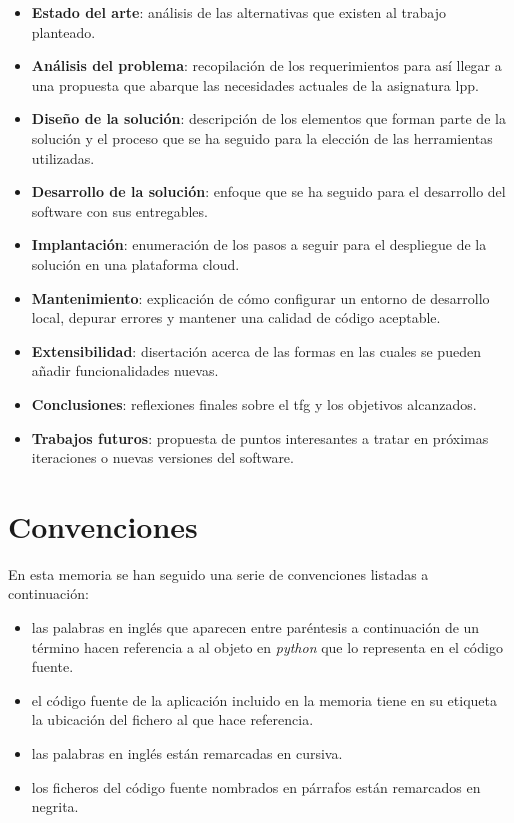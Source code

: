 \documentclass[11pt,spanish,listoffigures,listoftables]{tfgetsinf}
\begin{document}
\begin{itemize}
	\item \textbf{Estado del arte}: análisis de las alternativas que existen al trabajo planteado. 
	\item \textbf{Análisis del problema}: recopilación de los requerimientos para así llegar a una propuesta que abarque las necesidades actuales de la asignatura \acrshort{lpp}.
	\item \textbf{Diseño de la solución}: descripción de los elementos que forman parte de la solución y el proceso que se ha seguido para la elección de las herramientas utilizadas.
	\item \textbf{Desarrollo de la solución}: enfoque que se ha seguido para el desarrollo del software con sus entregables.
	\item \textbf{Implantación}: enumeración de los pasos a seguir para el despliegue de la solución en una plataforma \foreignlanguage{english}{cloud}.
	\item \textbf{Mantenimiento}: explicación de cómo configurar un entorno de desarrollo local, depurar errores y mantener una calidad de código aceptable. 
	\item \textbf{Extensibilidad}: disertación acerca de las formas en las cuales se pueden añadir funcionalidades nuevas.
	\item \textbf{Conclusiones}: reflexiones finales sobre el \acrshort{tfg} y los objetivos alcanzados.
	\item \textbf{Trabajos futuros}: propuesta de puntos interesantes a tratar en próximas iteraciones o nuevas versiones del software.
\end{itemize}

\section{Convenciones}

En esta memoria se han seguido una serie de convenciones listadas a continuación:

\begin{itemize}
	\item las palabras en inglés que aparecen entre paréntesis a continuación de un término hacen referencia a al objeto en \textit{python} que lo representa en el código fuente.
	\item el código fuente de la aplicación incluido en la memoria tiene en su etiqueta la ubicación del fichero al que hace referencia.
	\item las palabras en inglés están remarcadas en cursiva.
	\item los ficheros del código fuente nombrados en párrafos están remarcados en negrita.
\end{itemize}
\end{document}
